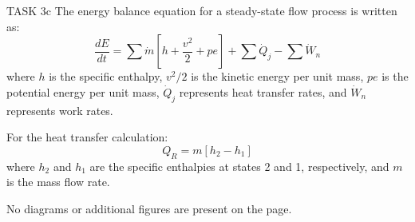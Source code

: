 TASK 3c  
The energy balance equation for a steady-state flow process is written as:  
\[
\frac{dE}{dt} = \sum \dot{m} \left[ h + \frac{v^2}{2} + pe \right] + \sum \dot{Q}_j - \sum \dot{W}_n
\]  
where \( h \) is the specific enthalpy, \( v^2/2 \) is the kinetic energy per unit mass, \( pe \) is the potential energy per unit mass, \( \dot{Q}_j \) represents heat transfer rates, and \( \dot{W}_n \) represents work rates.  

For the heat transfer calculation:  
\[
Q_R = m \left[ h_2 - h_1 \right]
\]  
where \( h_2 \) and \( h_1 \) are the specific enthalpies at states 2 and 1, respectively, and \( m \) is the mass flow rate.  

No diagrams or additional figures are present on the page.
